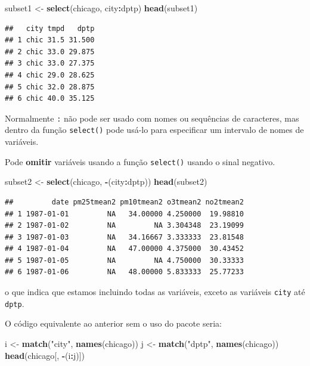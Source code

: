 \documentclass[a4paper]{book}
\newenvironment{Shaded}{\begin{snugshade}}{\end{snugshade}}
\newcommand{\KeywordTok}[1]{\textcolor[rgb]{0.13,0.29,0.53}{\textbf{#1}}}
\newcommand{\NormalTok}[1]{#1}
\newcommand{\OperatorTok}[1]{\textcolor[rgb]{0.81,0.36,0.00}{\textbf{#1}}}
\newcommand{\StringTok}[1]{\textcolor[rgb]{0.31,0.60,0.02}{#1}}
\begin{document}
\begin{Shaded}
\begin{Highlighting}[]
\NormalTok{subset1 <-}\StringTok{ }\KeywordTok{select}\NormalTok{(chicago, city}\OperatorTok{:}\NormalTok{dptp)}
\KeywordTok{head}\NormalTok{(subset1)}
\end{Highlighting}
\end{Shaded}

\begin{verbatim}
##   city tmpd   dptp
## 1 chic 31.5 31.500
## 2 chic 33.0 29.875
## 3 chic 33.0 27.375
## 4 chic 29.0 28.625
## 5 chic 32.0 28.875
## 6 chic 40.0 35.125
\end{verbatim}

Normalmente \texttt{:} não pode ser usado com nomes ou sequências de caracteres, mas dentro da função \texttt{select()} pode usá-lo para especificar um intervalo de nomes de variáveis.

Pode \textbf{omitir} variáveis usando a função \texttt{select()} usando o sinal negativo.

\begin{Shaded}
\begin{Highlighting}[]
\NormalTok{subset2 <-}\StringTok{ }\KeywordTok{select}\NormalTok{(chicago, }\OperatorTok{-}\NormalTok{(city}\OperatorTok{:}\NormalTok{dptp))}
\KeywordTok{head}\NormalTok{(subset2)}
\end{Highlighting}
\end{Shaded}

\begin{verbatim}
##         date pm25tmean2 pm10tmean2 o3tmean2 no2tmean2
## 1 1987-01-01         NA   34.00000 4.250000  19.98810
## 2 1987-01-02         NA         NA 3.304348  23.19099
## 3 1987-01-03         NA   34.16667 3.333333  23.81548
## 4 1987-01-04         NA   47.00000 4.375000  30.43452
## 5 1987-01-05         NA         NA 4.750000  30.33333
## 6 1987-01-06         NA   48.00000 5.833333  25.77233
\end{verbatim}

o que indica que estamos incluindo todas as variáveis, exceto as variáveis \texttt{city} até \texttt{dptp}.

O código equivalente ao anterior sem o uso do pacote seria:

\begin{Shaded}
\begin{Highlighting}[]
\NormalTok{i <-}\StringTok{ }\KeywordTok{match}\NormalTok{(}\StringTok{"city"}\NormalTok{, }\KeywordTok{names}\NormalTok{(chicago))}
\NormalTok{j <-}\StringTok{ }\KeywordTok{match}\NormalTok{(}\StringTok{"dptp"}\NormalTok{, }\KeywordTok{names}\NormalTok{(chicago))}
\KeywordTok{head}\NormalTok{(chicago[, }\OperatorTok{-}\NormalTok{(i}\OperatorTok{:}\NormalTok{j)])}
\end{Highlighting}
\end{Shaded}
\end{document}
